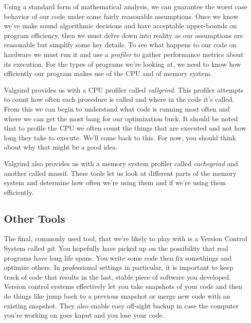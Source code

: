 \documentclass[nobib]{tufte-handout}
\begin{document}
Using a standard form of mathematical analysis, we can guarantee the worst case behavior of our code under some fairly reasonable assumptions. Once we know we've make sound algorithmic decisions and have acceptable upper-bounds on program efficiency, then we must delve down into reality as our assumptions are reasonable but simplify some key details. To see what happens to our code on hardware we must run it and use a \textit{profiler} to gather performance metrics about its execution.  For the types of programs we're looking at, we need to know how efficiently our program makes use of the CPU and of memory system.

Valgrind provides us with a CPU profiler called \textit{callgrind}. This profiler attempts to count how often each procedure is called and where in the code it's called.  From this we can begin to understand what code is running most often and where we can get the most bang for our optimization buck.  It should be noted that to profile the CPU we often count the things that are executed and not how long they take to execute.  We'll come back to this. For now, you should think about why that might be a good idea.

Valgrind also provides us with a memory system profiler called \textit{cachegrind} and another called {massif}.  These tools let us look at different parts of the memory system and determine how often we're using them and if we're using them efficiently.

\subsection{Other Tools}

The final, commonly used tool, that we're likely to play with is a Version Control System called \textit{git}. You hopefully have picked up on the possibility that real programs have long life spans.  You write some code then fix somethings and optimize others.  In professional settings in particular, it is important to keep track of code that results in the last, stable piece of software you developed.  Version control systems effectively let you take snapshots of your code and then do things like jump back to a previous snapshot or merge new code with an existing snapshot.  They also enable easy off-sight backup in case the computer you're working on goes kaput and you lose your code.
\end{document}
